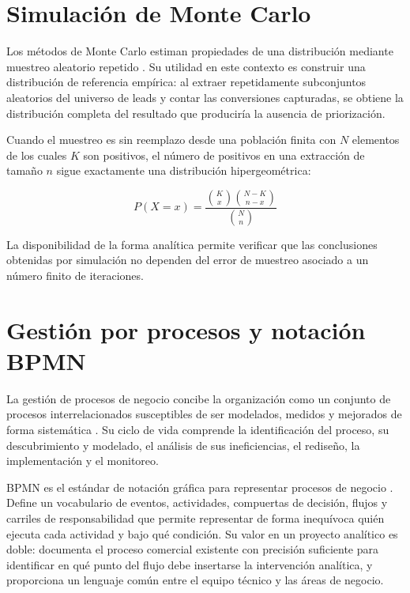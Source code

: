 \section{Simulación de Monte Carlo}

Los métodos de Monte Carlo estiman propiedades de una distribución mediante
muestreo aleatorio repetido \cite{raychaudhuri2008introduction, rubinstein2016simulation}.
Su utilidad en este contexto es construir una distribución de referencia empírica:
al extraer repetidamente subconjuntos aleatorios del universo de leads y contar las
conversiones capturadas, se obtiene la distribución completa del resultado que
produciría la ausencia de priorización.

Cuando el muestreo es sin reemplazo desde una población finita con $N$ elementos de
los cuales $K$ son positivos, el número de positivos en una extracción de tamaño $n$
sigue exactamente una distribución hipergeométrica:

\begin{equation}
P(X = x) = \frac{\binom{K}{x}\binom{N-K}{n-x}}{\binom{N}{n}}
\end{equation}

La disponibilidad de la forma analítica permite verificar que las conclusiones
obtenidas por simulación no dependen del error de muestreo asociado a un número
finito de iteraciones.

\section{Gestión por procesos y notación BPMN}

La gestión de procesos de negocio concibe la organización como un conjunto de
procesos interrelacionados susceptibles de ser modelados, medidos y mejorados de
forma sistemática \cite{dumas2018fundamentals}. Su ciclo de vida comprende la
identificación del proceso, su descubrimiento y modelado, el análisis de sus
ineficiencias, el rediseño, la implementación y el monitoreo.

BPMN es el estándar de notación gráfica para representar procesos de negocio
\cite{omg2011bpmn}. Define un vocabulario de eventos, actividades, compuertas de
decisión, flujos y carriles de responsabilidad que permite representar de forma
inequívoca quién ejecuta cada actividad y bajo qué condición. Su valor en un
proyecto analítico es doble: documenta el proceso comercial existente con precisión
suficiente para identificar en qué punto del flujo debe insertarse la intervención
analítica, y proporciona un lenguaje común entre el equipo técnico y las áreas de
negocio.

